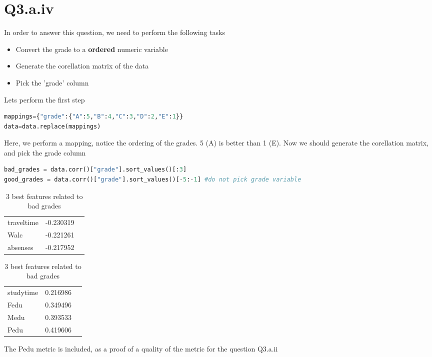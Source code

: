 \documentclass[openany]{article}
\begin{document}
	\section{Q3.a.iv}
		In order to answer this question, we need to perform the following tasks
		\begin{itemize}
			\item Convert the grade to a \textbf{ordered} numeric variable
			\item Generate the corellation matrix of the data
			\item Pick the 'grade' column
		\end{itemize}
		Lets perform the first step	
		\begin{lstlisting}[language=Python]
mappings={"grade":{"A":5,"B":4,"C":3,"D":2,"E":1}}
data=data.replace(mappings)
		\end{lstlisting}
		Here, we perform a mapping, notice the ordering of the grades. 5 (A) is better than 1 (E).
		Now we should generate the corellation matrix, and pick the grade column
		\begin{lstlisting}[language=Python]
bad_grades = data.corr()["grade"].sort_values()[:3]
good_grades = data.corr()["grade"].sort_values()[-5:-1] #do not pick grade variable
		\end{lstlisting}
		\begin{table}[H]
			\centering
			\caption{3 best features related to bad grades}
			\begin{tabular}{lll}
				
				traveltime & -0.230319 &  \\
				Walc       & -0.221261 &  \\
				absenses   & -0.217952 & 
			\end{tabular}
		\end{table}
		\begin{table}[H]
			\caption{3 best features related to bad grades}
			\centering
			\begin{tabular}{lll}
				studytime & 0.216986 & \\
				Fedu      & 0.349496 & \\
				Medu      & 0.393533 & \\
				Pedu	  & 0.419606 & \\
			\end{tabular}
		\end{table}
		The Pedu metric is included, as a proof of a quality of the metric for the question Q3.a.ii
		
	
\end{document}
